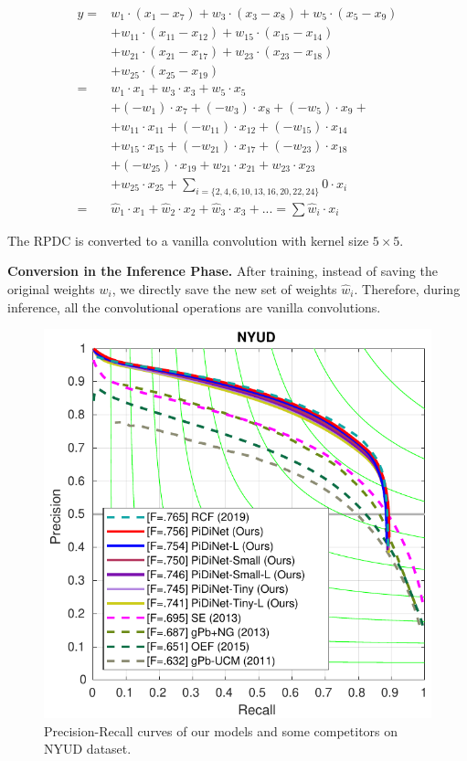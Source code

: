 \documentclass[10pt,twocolumn,letterpaper]{article}
\begin{document}
{\small
\begin{align}
    y =& w_{1}\cdot (x_1 - x_7) + w_3\cdot (x_3 - x_8)+w_5\cdot (x_5 - x_9)\nonumber\\
    & + w_{11}\cdot (x_{11}-x_{12}) + w_{15}\cdot (x_{15} - x_{14})\nonumber \\
    &  + w_{21}\cdot (x_{21} - x_{17}) + w_{23}\cdot (x_{23} - x_{18})\nonumber \\
    &  + w_{25}\cdot (x_{25} - x_{19})\nonumber\\
    =&w_1\cdot x_1 + w_3\cdot x_3 + w_5\cdot x_5\nonumber \\
    & + (-w_1)\cdot x_7 + (-w_3)\cdot x_8 + (-w_5)\cdot x_9 +\nonumber \\
    & + w_{11}\cdot x_{11} + (-w_{11})\cdot x_{12} + (-w_{15})\cdot x_{14}\nonumber\\
    & + w_{15}\cdot x_{15} + (-w_{21})\cdot x_{17} + (-w_{23})\cdot x_{18}\nonumber\\
    & + (-w_{25})\cdot x_{19} + w_{21}\cdot x_{21} + w_{23}\cdot x_{23}\nonumber\\
    & + w_{25}\cdot x_{25} + \sum_{i=\{2,4,6,10,13,16,20,22,24\}}0\cdot x_i\nonumber\\
    =&\hat{w}_1\cdot x_1 + \hat{w}_2\cdot x_2 + \hat{w}_3\cdot x_3 + ... =\sum \hat{w}_i\cdot x_i
\end{align}
}

The RPDC is converted to a vanilla convolution with kernel size $5\times 5$.

\vspace{0.3em}
\noindent  \textbf{Conversion in the Inference Phase.} \quad After training, instead of saving the original weights $w_i$, we directly save the new set of weights $\hat{w}_i$. Therefore, during inference, all the convolutional operations are vanilla convolutions.

\begin{figure}[t!]
    \centering
    \includegraphics[width=0.9\linewidth]{images/nyud_pr2.pdf}
    \caption{Precision-Recall curves of our models and some competitors on NYUD dataset.}
    \label{fig:nyud_pr}
\end{figure}
\end{document}
